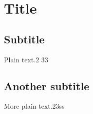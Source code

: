\documentclass{article}
\begin{document}
\section{Title}

\subsection{Subtitle}

Plain text.2
33
\subsection{Another subtitle}

More plain text.23ss
\end{document}
